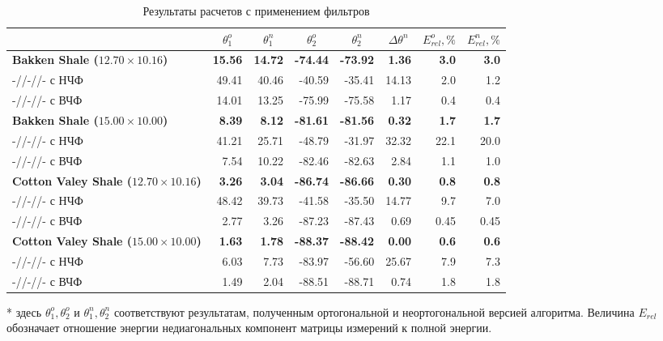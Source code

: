 \documentclass[a4paper,11pt]{article}
\begin{document}
\begin{table}[h]
\footnotesize
\centering
\caption{Результаты расчетов с применением фильтров}
\renewcommand{\arraystretch}{1.5}
\begin{tabularx}{\textwidth}{|X|rr|rr|r|rr|}
\hline
				&\multicolumn{1}{c}{$\theta_1^o$} & \multicolumn{1}{c|}{$\theta_1^n$} & \multicolumn{1}{c}{$\theta_2^o$} & \multicolumn{1}{c|}{$\theta_2^n$} & \multicolumn{1}{c|}{$\Delta\theta^n$}& \multicolumn{1}{c}{$E_{rel}^o, \%$} & \multicolumn{1}{c|}{$E_{rel}^n, \%$} \\ \hline
\hline	\textbf{Bakken Shale ($12.70 \times 10.16$)} & \textbf{15.56} & \textbf{14.72} & \textbf{-74.44}  & \textbf{-73.92}  & \textbf{1.36}  & \textbf{3.0} & \textbf{3.0} \\
		-//-//- с НЧФ & 49.41 & 40.46 & -40.59 & -35.41  & 14.13 & 2.0 & 1.2\\
		-//-//- с ВЧФ & 14.01 & 13.25 & -75.99 & -75.58  & 1.17 & 0.4 & 0.4\\
\hline	\textbf{Bakken Shale ($15.00 \times 10.00$)} & \textbf{8.39} & \textbf{8.12} & \textbf{-81.61}  & \textbf{-81.56} & \textbf{0.32}  & \textbf{1.7} & \textbf{1.7} \\
		-//-//- с НЧФ & 41.21 & 25.71 & -48.79 & -31.97  & 32.32 & 22.1 & 20.0\\
		-//-//- с ВЧФ & 7.54 & 10.22 & -82.46 & -82.63  & 2.84 & 1.1 & 1.0\\
\hline	\textbf{Cotton Valey Shale ($12.70 \times 10.16$)} & \textbf{3.26} & \textbf{3.04} & \textbf{-86.74}  & \textbf{-86.66}  & \textbf{0.30}  & \textbf{0.8} & \textbf{0.8}\\
		-//-//- с НЧФ & 48.42 & 39.73 & -41.58 & -35.50  & 14.77  & 9.7 & 7.0 \\
		-//-//- с ВЧФ & 2.77 & 3.26 & -87.23 & -87.43  & 0.69  & 0.45 & 0.45\\	
\hline	\textbf{Cotton Valey Shale ($15.00 \times 10.00$)} & \textbf{1.63} & \textbf{1.78} & \textbf{-88.37}  & \textbf{-88.42}  & \textbf{0.00}  & \textbf{0.6} & \textbf{0.6} \\
		-//-//- с НЧФ & 6.03 & 7.73 & -83.97 & -56.60  & 25.67  & 7.9 & 7.3 \\
		-//-//- с ВЧФ & 1.49 & 2.04 & -88.51 & -88.71  & 0.74  & 1.8 & 1.8\\		
\hline	
\end{tabularx} 
\begin{flushleft}
* здесь $\theta_1^o,\theta_2^o$ и $\theta_1^n,\theta_2^n$ соответствуют результатам, полученным ортогональной и неортогональной версией алгоритма. Величина $E_{rel}$ обозначает отношение энергии недиагональных компонент матрицы измерений к полной энергии.
\end{flushleft}
\label{tab:filter_process_results}
\renewcommand{\arraystretch}{1.0}
\end{table}
\end{document}
